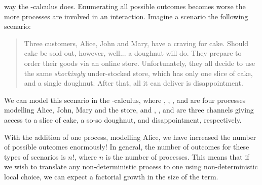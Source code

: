 \documentclass[UKenglish]{llncs}
\begin{document}
way the \textpi-calculus does.
%
Enumerating all possible outcomes becomes worse the more processes are involved
in an interaction. Imagine a scenario the following scenario:
\begin{quote}
  Three customers, Alice, John and Mary, have a craving for cake. Should cake be
  sold out, however, well... a doughnut will do. They prepare to order their
  goods via an online store. Unfortunately, they all decide to use the
  same \emph{shockingly} under-stocked store, which has only one slice of cake,
  and a single doughnut. After that, all it can deliver is disappointment.
\end{quote}
We can model this scenario in the \textpi-calculus, where \alice, \john,
\mary, and \store are four processes modelling Alice, John, Mary and the store,
and \sliceofcake, \doughnut, and \nope are three channels giving access to a
slice of cake, a so-so doughnut, and disappointment, respectively.
\begin{center}
\end{center}
With the addition of one process, modelling Alice, we have increased the number
of possible outcomes enormously! In general, the number of outcomes for these
types of scenarios is $n!$, where $n$ is the number of processes. This means
that if we wish to translate any non-deterministic process to one using
non-deterministic local choice, we can expect a factorial growth in the size of
the term.
\end{document}
